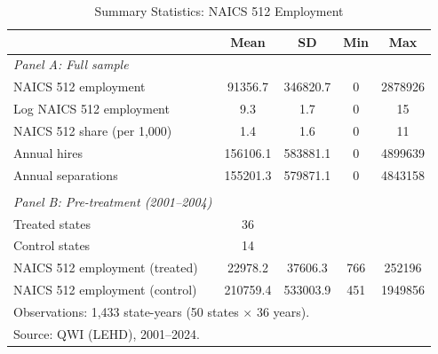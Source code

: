 \begin{table}[htbp]
\centering
\caption{Summary Statistics: NAICS 512 Employment}
\label{tab:summary}
\begin{tabular}{lcccc}
\hline\hline
 & Mean & SD & Min & Max \\
\hline
\textit{Panel A: Full sample} &  &  &  &  \\
NAICS 512 employment & 91356.7 & 346820.7 & 0 & 2878926 \\
Log NAICS 512 employment & 9.3 & 1.7 & 0 & 15 \\
NAICS 512 share (per 1,000) & 1.4 & 1.6 & 0 & 11 \\
Annual hires & 156106.1 & 583881.1 & 0 & 4899639 \\
Annual separations & 155201.3 & 579871.1 & 0 & 4843158 \\
 &  &  &  &  \\
\textit{Panel B: Pre-treatment (2001--2004)} &  &  &  &  \\
Treated states & 36 &  &  &  \\
Control states & 14 &  &  &  \\
NAICS 512 employment (treated) & 22978.2 & 37606.3 & 766 & 252196 \\
NAICS 512 employment (control) & 210759.4 & 533003.9 & 451 & 1949856 \\
\hline
\multicolumn{5}{l}{\footnotesize Observations: 1,433 state-years (50 states $\times$ 36 years).} \\
\multicolumn{5}{l}{\footnotesize Source: QWI (LEHD), 2001--2024.} \\
\hline\hline
\end{tabular}
\end{table}

